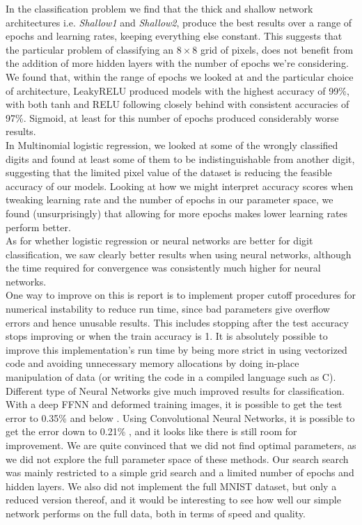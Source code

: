 \documentclass[11pt,a4paper,titlepage]{article}
\begin{document}
In the classification problem we find that the thick and shallow network architectures i.e. \emph{Shallow1} and \emph{Shallow2}, produce the best results over a range of epochs and learning rates, keeping everything else constant. This suggests that the particular problem of classifying an $8\times 8$ grid of pixels, does not benefit from the addition of more hidden layers with the number of epochs we're considering.\\We found that, within the range of epochs we looked at and the particular choice of architecture, LeakyRELU produced models with the highest accuracy of 99\%, with both tanh and RELU following closely behind with consistent accuracies of 97\%. Sigmoid, at least for this number of epochs produced considerably worse results.\\In Multinomial logistic regression, we looked at some of the wrongly classified digits and found at least some of them to be indistinguishable from another digit, suggesting that the limited pixel value of the dataset is reducing the feasible accuracy of our models. Looking at how we might interpret accuracy scores when tweaking learning rate and the number of epochs in our parameter space, we found (unsurprisingly) that allowing for more epochs makes lower learning rates perform better.\\As for whether logistic regression or neural networks are better for digit classification, we saw clearly better results when using neural networks, although the time required for convergence was consistently much higher for neural networks.\\

One way to improve on this is report is to implement proper cutoff procedures for numerical instability to reduce run time, since bad parameters give overflow errors and hence unusable results. This includes stopping after the test accuracy stops improving or when the train accuracy is 1. It is absolutely possible to improve this implementation's run time by being more strict in using vectorized code and avoiding unnecessary memory allocations by doing in-place manipulation of data (or writing the code in a compiled language such as C). Different type of Neural Networks give much improved results for classification. With a deep FFNN and deformed training images, it is possible to get the test error to 0.35\% and below \citep{betterThanUs}. Using Convolutional Neural Networks, it is possible to get the error down to 0.21\% \citep{Convolution}, and it looks like there is still room for improvement.  We are quite convinced that we did not find optimal parameters, as we did not explore the full parameter space of these methods. Our search search was mainly restricted to a simple grid search and a limited number of epochs and hidden layers. We also did not implement the full MNIST dataset, but only a reduced version thereof, and it would be interesting to see how well our simple network performs on the full data, both in terms of speed and quality. 
\end{document}
